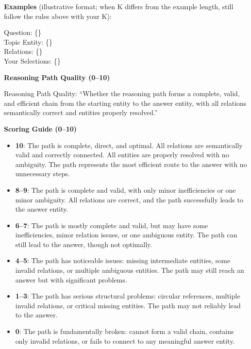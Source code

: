 \begin{tcolorbox}
\textbf{Examples} (illustrative format; when K differs from the example length, still follow the rules above with your K):

Question: \{\} \\
Topic Entity: \{\} \\
Relations: \{\} \\
Your Selections: \{\} 
\end{tcolorbox}

\vspace{0.3em}

\begin{tcolorbox}[
  colback=white,
  colframe=blue!60,
  colbacktitle=blue!30,
  coltitle=white,
  fonttitle=\bfseries\scriptsize,
  fontupper=\scriptsize,
  title=Evaluation Dimension Prompts,
  rounded corners,
  boxrule=0.5pt
]
\textbf{Reasoning Path Quality (0--10)}

Reasoning Path Quality: ``Whether the reasoning path forms a complete, valid, and efficient chain from the starting entity to the answer entity, with all relations semantically correct and entities properly resolved.''

\textbf{Scoring Guide (0--10)}
\begin{itemize}
  \item \textbf{10}: The path is complete, direct, and optimal. All relations are semantically valid and correctly connected. All entities are properly resolved with no ambiguity. The path represents the most efficient route to the answer with no unnecessary steps.
  \item \textbf{8--9}: The path is complete and valid, with only minor inefficiencies or one minor ambiguity. All relations are correct, and the path successfully leads to the answer entity.
  \item \textbf{6--7}: The path is mostly complete and valid, but may have some inefficiencies, minor relation issues, or one ambiguous entity. The path can still lead to the answer, though not optimally.
  \item \textbf{4--5}: The path has noticeable issues: missing intermediate entities, some invalid relations, or multiple ambiguous entities. The path may still reach an answer but with significant problems.
  \item \textbf{1--3}: The path has serious structural problems: circular references, multiple invalid relations, or critical missing entities. The path may not reliably lead to the answer.
  \item \textbf{0}: The path is fundamentally broken: cannot form a valid chain, contains only invalid relations, or fails to connect to any meaningful answer entity.
\end{itemize}


\end{tcolorbox}
